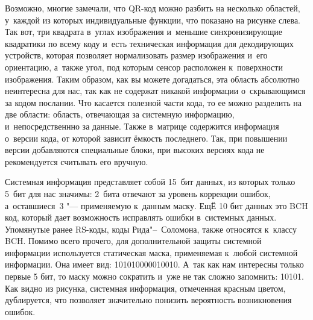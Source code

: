 \documentclass[final,pdftex]{../../template/epsilonj}
\begin{document}
Возможно, многие замечали, что QR-код можно разбить на несколько областей, у~каждой из которых индивидуальные функции, что показано на рисунке слева. Так вот, три квадрата в~углах изображения и~меньшие синхронизирующие квадратики по всему коду и~есть техническая информация для декодирующих устройств, которая позволяет нормализовать размер изображения и~его ориентацию, а~также угол, под которым сенсор расположен к~поверхности изображения. Таким образом, как вы можете догадаться, эта область абсолютно неинтересна для нас, так как не содержат никакой информации о~скрывающимся за кодом послании. Что касается полезной части кода, то ее можно разделить на две области: область, отвечающая за системную информацию, и~непосредственнно за данные. Также в~матрице содержится информация о~версии кода, от которой зависит ёмкость последнего. Так, при повышении версии добавляются специальные блоки, при высоких версиях кода не рекомендуется считывать его вручную.

Системная информация представляет собой 15~бит данных, из которых только 5~бит для нас значимы: 2~бита отвечают за уровень коррекции ошибок, а~оставшиеся~3 "--- применяемую к~данным маску. ЕщЁ 10 бит данных это BCH код, который дает возможность исправлять ошибки в~системных данных. Упомянутые ранее RS-коды, коды Рида"--~Соломона, также относятся к~классу BCH. Помимо всего прочего, для дополнительной защиты системной информации используется статическая маска, применяемая к~любой системной информации. Она имеет вид: 101010000010010. А~так как нам интересны только первые 5 бит, то маску можно сократить и~уже не так сложно запомнить: 10101. Как видно из рисунка, системная информация, отмеченная красным цветом, дублируется, что позволяет значительно понизить вероятность возникновения ошибок.
\end{document}
